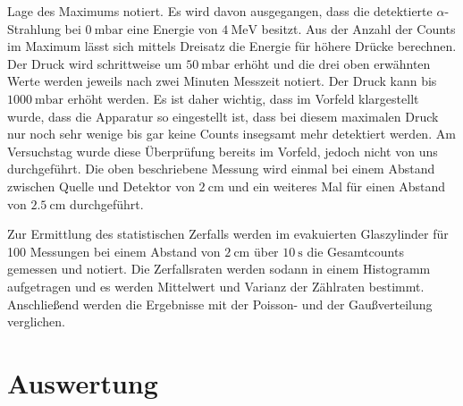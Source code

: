 Lage des Maximums notiert. Es wird davon ausgegangen, dass die detektierte $\alpha$-Strahlung bei $\SI{0}{\milli \bar}$ eine Energie
von $\SI{4}{\mega \eV}$ besitzt. Aus der Anzahl der Counts im Maximum lässt sich mittels Dreisatz die Energie für höhere Drücke
berechnen. Der Druck wird schrittweise um $\SI{50}{\milli \bar}$ erhöht und die drei oben erwähnten Werte werden jeweils nach zwei Minuten Messzeit
notiert. Der Druck kann bis $\SI{1000}{\milli \bar}$ erhöht werden. Es ist daher wichtig, dass im Vorfeld klargestellt wurde, dass die Apparatur
so eingestellt ist, dass bei diesem maximalen Druck nur noch sehr wenige bis gar keine Counts insegsamt mehr detektiert werden.
Am Versuchstag wurde diese Überprüfung bereits im Vorfeld, jedoch nicht von uns durchgeführt.
Die oben beschriebene Messung wird einmal bei einem Abstand zwischen Quelle und Detektor von $\SI{2}{\cm}$ und ein weiteres Mal für einen Abstand
von $\SI{2,5}{\cm}$ durchgeführt.

\noindent Zur Ermittlung des statistischen Zerfalls werden im evakuierten Glaszylinder für 100 Messungen bei einem Abstand von $\SI{2}{\cm}$
über $\SI{10}{\second}$ die Gesamtcounts gemessen und notiert. Die Zerfallsraten werden sodann in einem Histogramm aufgetragen und es werden
Mittelwert und Varianz der Zählraten bestimmt. Anschließend werden die Ergebnisse mit der Poisson- und der Gaußverteilung verglichen.

\section{Auswertung}
